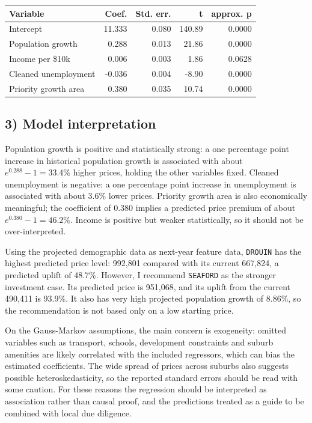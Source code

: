 \documentclass[11pt]{article}
\begin{document}
\begin{center}
\begin{tabular}{lrrrr}
\toprule
Variable & Coef. & Std. err. & t & approx. p \\
\midrule
Intercept & 11.333 & 0.080 & 140.89 & 0.0000 \\
Population growth & 0.288 & 0.013 & 21.86 & 0.0000 \\
Income per \$10k & 0.006 & 0.003 & 1.86 & 0.0628 \\
Cleaned unemployment & -0.036 & 0.004 & -8.90 & 0.0000 \\
Priority growth area & 0.380 & 0.035 & 10.74 & 0.0000 \\
\bottomrule
\end{tabular}
\end{center}

\subsection*{3) Model interpretation}
Population growth is positive and statistically strong: a one percentage point increase in historical population growth is associated with about \(e^{0.288}-1=33.4\%\) higher prices, holding the other variables fixed. Cleaned unemployment is negative: a one percentage point increase in unemployment is associated with about 3.6\% lower prices. Priority growth area is also economically meaningful; the coefficient of 0.380 implies a predicted price premium of about \(e^{0.380}-1=46.2\%\). Income is positive but weaker statistically, so it should not be over-interpreted.

Using the projected demographic data as next-year feature data, \texttt{DROUIN} has the highest predicted price level: 992,801 compared with its current 667,824, a predicted uplift of 48.7\%. However, I recommend \texttt{SEAFORD} as the stronger investment case. Its predicted price is 951,068, and its uplift from the current 490,411 is 93.9\%. It also has very high projected population growth of 8.86\%, so the recommendation is not based only on a low starting price.

On the Gauss-Markov assumptions, the main concern is exogeneity: omitted variables such as transport, schools, development constraints and suburb amenities are likely correlated with the included regressors, which can bias the estimated coefficients. The wide spread of prices across suburbs also suggests possible heteroskedasticity, so the reported standard errors should be read with some caution. For these reasons the regression should be interpreted as association rather than causal proof, and the predictions treated as a guide to be combined with local due diligence.
\end{document}
